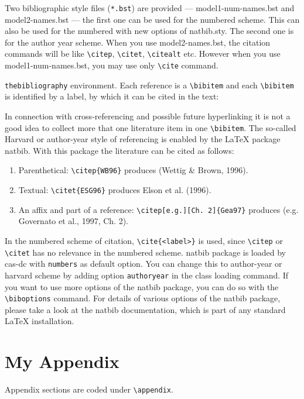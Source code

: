 \documentclass[a4paper,fleqn]{cas-dc}
\begin{document}
Two bibliographic style files (\verb+*.bst+) are provided ---
{model1-num-names.bst} and {model2-names.bst} --- the first one can be
used for the numbered scheme. This can also be used for the numbered
with new options of {natbib.sty}. The second one is for the author year
scheme. When  you use model2-names.bst, the citation commands will be
like \verb+\citep+,  \verb+\citet+, \verb+\citealt+ etc. However when
you use model1-num-names.bst, you may use only \verb+\cite+ command.

\verb+thebibliography+ environment.  Each reference is a\linebreak
\verb+\bibitem+ and each \verb+\bibitem+ is identified by a label,
by which it can be cited in the text:

\noindent In connection with cross-referencing and
possible future hyperlinking it is not a good idea to collect
more that one literature item in one \verb+\bibitem+.  The
so-called Harvard or author-year style of referencing is enabled
by the \LaTeX{} package {natbib}. With this package the
literature can be cited as follows:

\begin{enumerate}[\textbullet]
\item Parenthetical: \verb+\citep{WB96}+ produces (Wettig \& Brown, 1996).
\item Textual: \verb+\citet{ESG96}+ produces Elson et al. (1996).
\item An affix and part of a reference:\break
\verb+\citep[e.g.][Ch. 2]{Gea97}+ produces (e.g. Governato et
al., 1997, Ch. 2).
\end{enumerate}

In the numbered scheme of citation, \verb+\cite{<label>}+ is used,
since \verb+\citep+ or \verb+\citet+ has no relevance in the numbered
scheme.  {natbib} package is loaded by {cas-dc} with
\verb+numbers+ as default option.  You can change this to author-year
or harvard scheme by adding option \verb+authoryear+ in the class
loading command.  If you want to use more options of the {natbib}
package, you can do so with the \verb+\biboptions+ command.  For
details of various options of the {natbib} package, please take a
look at the {natbib} documentation, which is part of any standard
\LaTeX{} installation.

\appendix
\section{My Appendix}
Appendix sections are coded under \verb+\appendix+.
\end{document}
